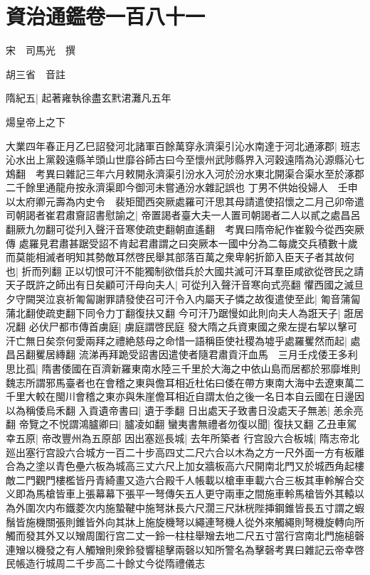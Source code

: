 \section{資治通鑑卷一百八十一}
宋　司馬光　撰

胡三省　音註

隋紀五|{
	起著雍執徐盡玄黓涒灘凡五年}


煬皇帝上之下

大業四年春正月乙巳詔發河北諸軍百餘萬穿永濟渠引沁水南達于河北通涿郡|{
	班志沁水出上黨穀遠縣羊頭山世靡谷師古曰今至懷州武陟縣界入河穀遠隋為沁源縣沁七鴆翻　考異曰雜記三年六月敕開永濟渠引汾水入河於汾水東北開渠合渠水至於涿郡二千餘里通龍舟按永濟渠即今御河未嘗通汾水雜記誤也}
丁男不供始役婦人　壬申以太府卿元壽為内史令　裴矩聞西突厥處羅可汗思其母請遣使招懷之二月己卯帝遣司朝謁者崔君肅齎詔書慰諭之|{
	帝置謁者臺大夫一人置司朝謁者二人以貳之處昌呂翻厥九勿翻可從刋入聲汗音寒使疏吏翻朝直遙翻　考異曰隋帝紀作崔毅今從西突厥傳}
處羅見君肅甚踞受詔不肯起君肅謂之曰突厥本一國中分為二每歲交兵積數十歲而莫能相滅者明知其勢敵耳然啓民舉其部落百萬之衆卑躬折節入臣天子者其故何也|{
	折而列翻}
正以切恨可汗不能獨制欲借兵於大國共滅可汗耳羣臣咸欲從啓民之請天子既許之師出有日矣顧可汗母向夫人|{
	可從刋入聲汗音寒向式亮翻}
懼西國之滅旦夕守闕哭泣哀祈匍匐謝罪請發使召可汗令入内屬天子憐之故復遣使至此|{
	匍音蒲匐蒲北翻使疏吏翻下同令力丁翻復扶又翻}
今可汗乃踞慢如此則向夫人為誑天子|{
	誑居况翻}
必伏尸都市傳首虜庭|{
	虜庭謂啓民庭}
發大隋之兵資東國之衆左提右挈以擊可汗亡無日矣奈何愛兩拜之禮絶慈母之命惜一語稱臣使社稷為墟乎處羅矍然而起|{
	處昌呂翻矍居縳翻}
流涕再拜跪受詔書因遣使者隨君肅貢汗血馬　三月壬戍倭王多利思比孤|{
	隋書倭國在百濟新羅東南水陸三千里於大海之中依山島而居都於邪靡堆則魏志所謂邪馬臺者也在會稽之東與儋耳相近杜佑曰倭在帶方東南大海中去遼東萬二千里大較在閩川會稽之東亦與朱崖儋耳相近自謂太伯之後一名日本自云國在日邊因以為稱倭烏禾翻}
入貢遺帝書曰|{
	遺于季翻}
日出處天子致書日没處天子無恙|{
	恙余亮翻}
帝覽之不悦謂鴻臚卿曰|{
	臚凌如翻}
蠻夷書無禮者勿復以聞|{
	復扶又翻}
乙丑車駕幸五原|{
	帝改豐州為五原部}
因出塞廵長城|{
	去年所築者}
行宫設六合板城|{
	隋志帝北廵出塞行宫設六合城方一百二十步高四丈二尺六合以木為之方一尺外面一方有板離合為之塗以青色壘六板為城高三丈六尺上加女牆板高六尺開南北門又於城西角起樓敵二門觀門樓檻皆丹青綺畫又造六合殿千人帳載以槍車車載六合三板其車軨解合交义即為馬槍皆車上張幕幕下張平一弩傳矢五人更守兩車之間施車軨馬槍皆外其轅以為外圍次内布鐵菱次内施蟄鞬中施弩牀長六尺濶三尺牀桄陛挿鋼錐皆長五寸謂之蝦鬚皆施機關張則錐皆外向其牀上施旋機弩以繩連弩機人從外來觸繩則弩機旋轉向所觸而發其外又以矰周圍行宫二丈一鈴一柱柱舉矰去地二尺五寸當行宫南北門施槌磬連矰以機發之有人觸矰則衆鈴發響槌擊兩磬以知所警名為擊磬考異曰雜記云帝幸啓民帳造行城周二千步高二十餘丈今從隋禮儀志}
